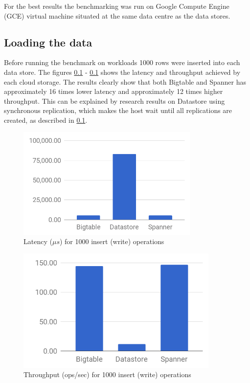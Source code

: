 \documentclass[bsc,frontabs,twoside,singlespacing,parskip,deptreport]{infthesis}     %
\begin{document}

For the best results the benchmarking was run on Google Compute Engine (GCE) virtual machine situated at the same data centre as the data stores.

\subsection{Loading the data}

Before running the benchmark on workloads 1000 rows were inserted into each data store. The figures \ref{} - \ref{} shows the latency and throughput achieved by each cloud storage. The results clearly show that both Bigtable and Spanner has approximately 16 times lower latency and approximately 12 times higher throughput. This can be explained by research results on Datastore using synchronous replication, which makes the host wait until all replications are created, as described in \ref{}.


\begin{figure}[h]
	\centering
	\includegraphics[width=9cm]{load-latency}
	\caption{Latency (\( \mu s\)) for 1000 insert (write) operations}
\end{figure}
\begin{figure}[t]
	\centering
	\includegraphics[width=10cm]{load-throughput}
	\caption{Throughput (ops/sec) for 1000 insert (write) operations}
\end{figure}
\end{document}
